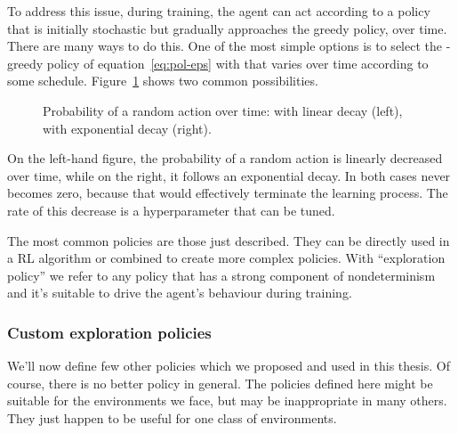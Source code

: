 To address this issue, during training, the agent can act according to a
policy that is initially stochastic but gradually approaches the greedy
policy, over time. There are many ways to do this. One of the most simple
options is to select the \eps{}-greedy policy of equation~\eqref{eq:pol-eps}
with \eps{} that varies over time according to some schedule.
Figure~\ref{fig:policy-schedules} shows two common possibilities.
\begin{figure}
	\centering
	\qquad
	\caption{Probability of a random action over time: \eps{} with linear decay
	(left), \eps{} with exponential decay (right).}
	\label{fig:policy-schedules}
\end{figure}
On the left-hand figure, the probability of a random action is linearly
decreased over time, while on the right, it follows an exponential decay. In
both cases \eps{} never becomes zero, because that would effectively terminate
the learning process. The rate of this decrease is a hyperparameter that
can be tuned.

The most common policies are those just described. They can be directly
used in a RL algorithm or combined to create more complex policies. With
``exploration policy'' we refer to any policy that has a strong component of
nondeterminism and it's suitable to drive the agent's behaviour during
training.
\raggedbottom


\subsubsection*{Custom exploration policies}

We'll now define few other policies which we proposed and used in this
thesis. Of course, there is no better policy in general. The policies defined
here might be suitable for the environments we face, but may be inappropriate
in many others. They just happen to be useful for one class of environments.

